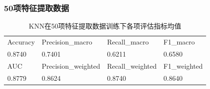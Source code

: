 \documentclass[10pt]{article}
\begin{document}
\subsubsection*{50项特征提取数据}
\begin{table}[H]
  \centering
  \caption{KNN在50项特征提取数据训练下各项评估指标均值}
  \begin{tabular}{llll}
  \toprule
  Accuracy & Precision\_macro & Recall\_macro & F1\_macro \\
  0.8740 & 0.7401 & 0.6211 & 0.6580 \\
  \midrule
  AUC & Precision\_weighted & Recall\_weighted & F1\_weighted \\
  0.8779 & 0.8624 & 0.8740 & 0.8640 \\
  \bottomrule
  \end{tabular}
\end{table}
\end{document}
